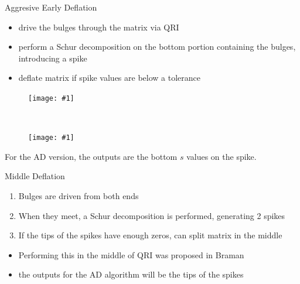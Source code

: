 \documentclass[12pt]{beamer}
\newcommand{\pic}[1]{\texttt{[image: \#1]}}
\begin{document}
  \begin{frame}{Aggresive Early Deflation}
    \begin{itemize}
      \item drive the bulges through the matrix via QRI
      \item perform a Schur decomposition on the bottom portion containing the bulges, introducing a spike
      \item deflate matrix if spike values are below a tolerance
    \end{itemize}

    \begin{figure}[h!]
      \begin{minipage}[t]{.5\linewidth}
        \centering
        \pic{agDef1}
      \end{minipage}~
      \begin{minipage}[t]{.5\linewidth}
        \centering
        \pic{agDef2}
      \end{minipage}
    \end{figure}
    
    For the AD version, the outputs are the bottom $s$ values on the spike.
  \end{frame}

  \begin{frame}{Middle Deflation}
    \begin{enumerate}
      \item Bulges are driven from both ends
      \item When they meet, a Schur decomposition is performed, generating 2 spikes\cite{}
      \item If the tips of the spikes have enough zeros, can split matrix in the middle
    \end{enumerate}

    \begin{itemize}
      \item Performing this in the middle of QRI was proposed in Braman %
      \item the outputs for the AD algorithm will be the tips of the spikes
    \end{itemize}
  \end{frame}
\end{document}

